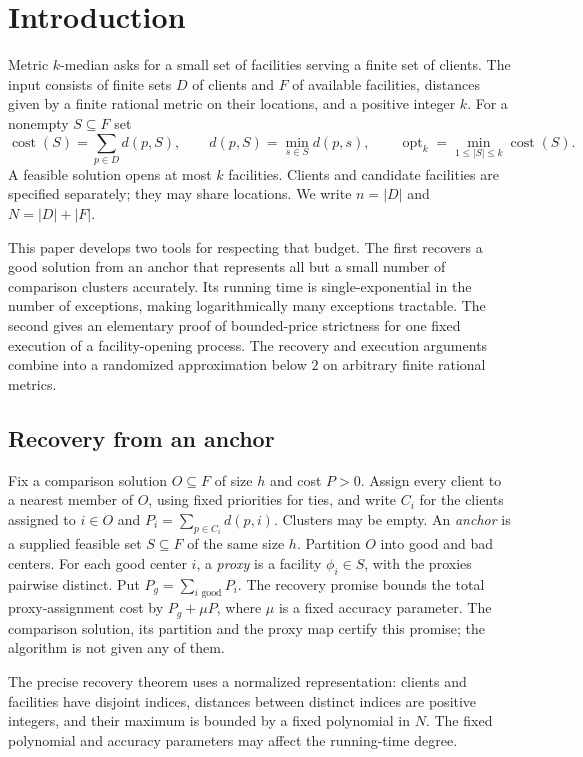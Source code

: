 \section{Introduction}\label{main:introduction}

Metric $k$-median asks for a small set of facilities serving a finite set
of clients.  The input consists of finite sets $D$ of clients and $F$ of
available facilities, distances given by a finite rational metric on their
locations, and a positive integer $k$.  For a nonempty $S\subseteq F$ set
\[
 \operatorname{cost}(S)=\sum_{p\in D}d(p,S),\qquad
 d(p,S)=\min_{s\in S}d(p,s),
 \qquad
 \operatorname{opt}_k=\min_{1\le|S|\le k}\operatorname{cost}(S).
\]
A feasible solution opens at most $k$ facilities.  Clients and candidate
facilities are specified separately; they may share locations.
We write $n=|D|$ and $N=|D|+|F|$.

This paper develops two tools for respecting that budget.  The first
recovers a good solution from an anchor that represents all but a small
number of comparison clusters accurately.  Its running time is single-exponential
in the number of exceptions, making logarithmically many exceptions
tractable.  The second gives an elementary proof of bounded-price
strictness for one fixed execution of a facility-opening process.
The recovery and execution arguments combine into a randomized
approximation below $2$ on arbitrary finite rational metrics.

\subsection{Recovery from an anchor}

Fix a comparison solution $O\subseteq F$ of size $h$ and cost $P>0$.
Assign every client to a nearest member of $O$, using fixed priorities
for ties, and write $C_i$ for the clients assigned to $i\in O$ and
$P_i=\sum_{p\in C_i}d(p,i)$.  Clusters may be empty.
An \emph{anchor} is a supplied feasible set $S\subseteq F$ of the same
size $h$.  Partition $O$ into good and bad centers.  For each good
center $i$, a \emph{proxy} is a facility $\phi_i\in S$, with the proxies
pairwise distinct.  Put $P_g=\sum_{i\text{ good}}P_i$.
The recovery promise bounds the total proxy-assignment cost by
$P_g+\mu P$, where $\mu$ is a fixed accuracy parameter.  The comparison
solution, its partition and the proxy map certify this promise; the
algorithm is not given any of them.

The precise recovery theorem uses a normalized representation: clients
and facilities have disjoint indices, distances between distinct indices
are positive integers, and their maximum is bounded by a fixed polynomial
in $N$.  The fixed polynomial and accuracy parameters may affect the
running-time degree.

